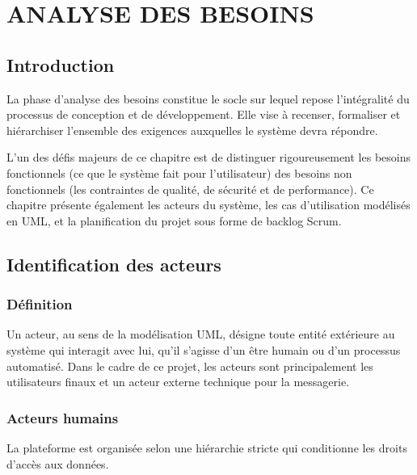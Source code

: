 \chapter{ANALYSE DES BESOINS}

\section{Introduction}

La phase d'analyse des besoins constitue le socle sur lequel repose l'intégralité du processus de conception et de développement. Elle vise à recenser, formaliser et hiérarchiser l'ensemble des exigences auxquelles le système devra répondre. 

L'un des défis majeurs de ce chapitre est de distinguer rigoureusement les besoins fonctionnels (ce que le système fait pour l'utilisateur) des besoins non fonctionnels (les contraintes de qualité, de sécurité et de performance). Ce chapitre présente également les acteurs du système, les cas d'utilisation modélisés en UML, et la planification du projet sous forme de backlog Scrum.

\section{Identification des acteurs}

\subsection{Définition}

Un acteur, au sens de la modélisation UML, désigne toute entité extérieure au système qui interagit avec lui, qu'il s'agisse d'un être humain ou d'un processus automatisé. Dans le cadre de ce projet, les acteurs sont principalement les utilisateurs finaux et un acteur externe technique pour la messagerie.

\subsection{Acteurs humains}

La plateforme est organisée selon une hiérarchie stricte qui conditionne les droits d'accès aux données.

